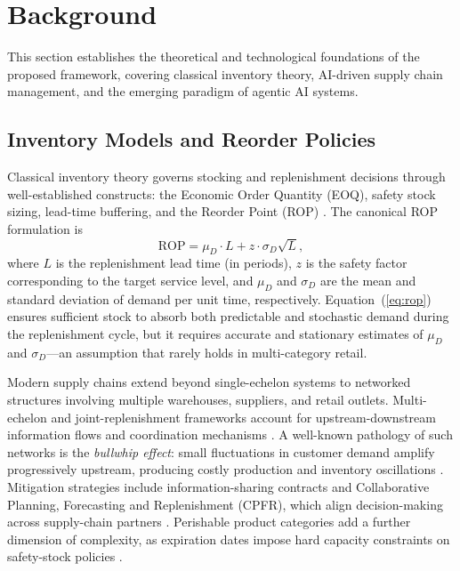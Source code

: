 \documentclass[utf8]{FrontiersinHarvard}
\begin{document}
	\section{Background}
	\label{sec:background}

	This section establishes the theoretical and technological foundations
	of the proposed framework, covering classical inventory theory,
	AI-driven supply chain management, and the emerging paradigm of
	agentic AI systems.

	\subsection{Inventory Models and Reorder Policies}

	Classical inventory theory governs stocking and replenishment decisions
	through well-established constructs: the Economic Order Quantity (EOQ),
	safety stock sizing, lead-time buffering, and the Reorder Point (ROP)
	\cite{nahmias2019production}.  The canonical ROP formulation is
	\begin{equation}
		\label{eq:rop}
		\text{ROP} = \mu_D \cdot L + z \cdot \sigma_D \sqrt{L},
	\end{equation}
	where $L$ is the replenishment lead time (in periods), $z$ is the
	safety factor corresponding to the target service level, and $\mu_D$
	and $\sigma_D$ are the mean and standard deviation of demand per unit
	time, respectively.  Equation~(\ref{eq:rop}) ensures sufficient stock
	to absorb both predictable and stochastic demand during the
	replenishment cycle, but it requires accurate and stationary estimates
	of $\mu_D$ and $\sigma_D$---an assumption that rarely holds in
	multi-category retail.

	Modern supply chains extend beyond single-echelon systems to networked
	structures involving multiple warehouses, suppliers, and retail outlets.
	Multi-echelon and joint-replenishment frameworks account for
	upstream-downstream information flows and coordination mechanisms
	\cite{axsater2015inventory}.  A well-known pathology of such networks
	is the \emph{bullwhip effect}: small fluctuations in customer demand
	amplify progressively upstream, producing costly production and inventory
	oscillations \cite{bullwhip2007effect}.  Mitigation strategies include
	information-sharing contracts and Collaborative Planning, Forecasting and
	Replenishment (CPFR), which align decision-making across supply-chain
	partners \cite{sari2008collaborative}.  Perishable product categories
	add a further dimension of complexity, as expiration dates impose hard
	capacity constraints on safety-stock policies \cite{nahmias1982perishable,
	karaesmen2011perishable}.
\end{document}

